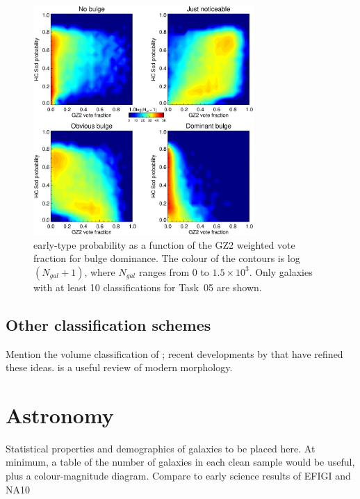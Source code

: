 \documentclass[useAMS,usenatbib]{mn2e}
\begin{document}
\begin{figure}
\includegraphics[angle=0,width=3.3in]{figures/hc_gz2_bulge_contour.eps}
\caption{\citet{hue11} early-type probability as a function of the GZ2 weighted vote fraction for bulge dominance. The colour of the contours is log~$(N_{gal} + 1)$, where $N_{gal}$ ranges from 0 to $1.5\times10^3$. Only galaxies with at least 10 classifications for Task~05 are shown.   
\label{fig-hc_gz2_bulge_contour}}
\end{figure}

\subsection{Other classification schemes}

Mention the volume classification of \citet{dev59}; recent developments by \citet{kor12,lau11,cap11,kra11} that have refined these ideas. \citet{but11} is a useful review of modern morphology. 


\section{Astronomy}\label{sec_astronomy}

Statistical properties and demographics of galaxies to be placed here. At minimum, a table of the number of galaxies in each clean sample would be useful, plus a colour-magnitude diagram. Compare to early science results of EFIGI \citep{del11a} and NA10 \citep{nai10a,nai10b}
\end{document}
